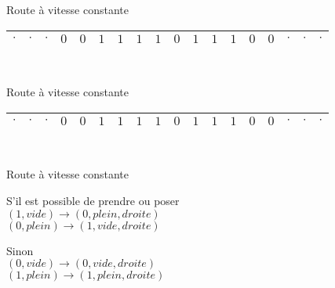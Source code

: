 \documentclass[12pt]{beamer}
\begin{document}
\begin{frame}{Route à vitesse constante}
\begin{center}
    \begin{tabular}{|c|c|c|c|c|c|c|c|c|c|c|c|c|c|c|c|c|c|}\hline
     $\cdot$ & $\cdot$ & $\cdot$ & $0$ & $0$ & $1$ & $1$ & $1$ & $1$ & $0$ & $1$ & $1$ & $1$ & $0$ & $0$ & $\cdot$ & $\cdot$ & $\cdot$ \\\hline
     
\end{tabular}\\
\end{center}
\end{frame}

\begin{frame}{Route à vitesse constante}
\begin{center}
    \begin{tabular}{|c|c|c|c|c|c|c|c|c|c|c|c|c|c|c|c|c|c|}\hline
     $\cdot$ & $\cdot$ & $\cdot$ & $0$ & $0$ & $1$ & $1$ & $1$ & $1$ & $0$ & $1$ & $1$ & $1$ & $0$ & $0$ & $\cdot$ & $\cdot$ & $\cdot$ \\\hline
     
\end{tabular}\\
\end{center}
\end{frame}

\begin{frame}{Route à vitesse constante}
\begin{center}
S'il est possible de prendre ou poser\\
$(1,vide) \longrightarrow (0, plein, droite)$\\
$(0,plein) \longrightarrow (1, vide, droite)$\\

\pause
\vspace{0.5cm}


Sinon\\
$(0,vide) \longrightarrow (0, vide, droite)$\\
$(1,plein) \longrightarrow (1, plein, droite)$\\
\end{center}
\end{frame}
\end{document}
